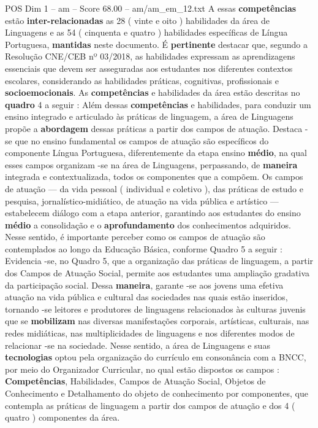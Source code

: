 \begin{textsample}{POS Dim 1 – am – Score 68.00 – am/am\_em\_12.txt}
A essas \textbf{competências} estão \textbf{inter-relacionadas} as 28 ( vinte e oito ) habilidades da área de Linguagens e as 54 ( cinquenta e quatro ) habilidades específicas de Língua Portuguesa, \textbf{mantidas} neste documento.
É \textbf{pertinente} destacar que, segundo a Resolução CNE/CEB nº 03/2018, as habilidades expressam as aprendizagens essenciais que devem ser asseguradas aos estudantes nos diferentes contextos escolares, considerando as habilidades práticas, cognitivas, profissionais e \textbf{socioemocionais}.
As \textbf{competências} e habilidades da área estão descritas no \textbf{quadro} 4 a seguir : Além dessas \textbf{competências} e habilidades, para conduzir um ensino integrado e articulado às práticas de linguagem, a área de Linguagens propõe a \textbf{abordagem} dessas práticas a partir dos campos de atuação.
Destaca -se que no ensino fundamental os campos de atuação são específicos do componente Língua Portuguesa, diferentemente da etapa ensino \textbf{médio}, na qual esses campos organizam -se na área de Linguagens, perpassando, de \textbf{maneira} integrada e contextualizada, todos os componentes que a compõem.
Os campos de atuação — da vida pessoal ( individual e coletivo ), das práticas de estudo e pesquisa, jornalístico-midiático, de atuação na vida pública e artístico — estabelecem diálogo com a etapa anterior, garantindo aos estudantes do ensino \textbf{médio} a consolidação e o \textbf{aprofundamento} dos conhecimentos adquiridos.
Nesse sentido, é importante perceber como os campos de atuação são contemplados ao longo da Educação Básica, conforme Quadro 5 a seguir : Evidencia -se, no Quadro 5, que a organização das práticas de linguagem, a partir dos Campos de Atuação Social, permite aos estudantes uma ampliação gradativa da participação social.
Dessa \textbf{maneira}, garante -se aos jovens uma efetiva atuação na vida pública e cultural das sociedades nas quais estão inseridos, tornando -se leitores e produtores de linguagens relacionados às culturas juvenis que se \textbf{mobilizam} nas diversas manifestações corporais, artísticas, culturais, nas redes midiáticas, nas multiplicidades de linguagens e nos diferentes modos de relacionar -se na sociedade.
Nesse sentido, a área de Linguagens e suas \textbf{tecnologias} optou pela organização do currículo em consonância com a BNCC, por meio do Organizador Curricular, no qual estão dispostos os campos : \textbf{Competências}, Habilidades, Campos de Atuação Social, Objetos de Conhecimento e Detalhamento do objeto de conhecimento por componentes, que contempla as práticas de linguagem a partir dos campos de atuação e dos 4 ( quatro ) componentes da área.

\end{textsample}
